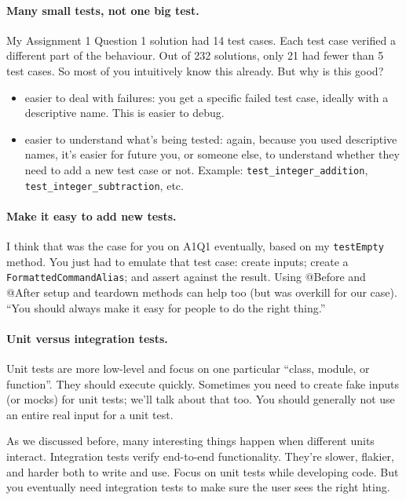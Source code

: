 \documentclass[11pt]{article}
\begin{document}
\paragraph{Many small tests, not one big test.} My Assignment 1 Question 1 solution had 14 test cases.
Each test case verified a different part of the behaviour. Out of 232 solutions, only 21 had fewer
than 5 test cases. So most of you intuitively know this already. But why is this good?

\begin{itemize}
\item easier to deal with failures: you get a specific failed test case, ideally with a descriptive name.
This is easier to debug.
\item easier to understand what's being tested: again, because you used descriptive names, it's easier
for future you, or someone else, to understand whether they need to add a new test case or not.
Example: {\tt test\_integer\_addition}, {\tt test\_integer\_subtraction}, etc.
\end{itemize}

\paragraph{Make it easy to add new tests.} I think that was the case for you on A1Q1 eventually,
based on my {\tt testEmpty} method. You just had to emulate that test
case: create inputs; create a {\tt FormattedCommandAlias}; and assert
against the result. Using @Before and @After setup and teardown
methods can help too (but was overkill for our case). ``You should
always make it easy for people to do the right thing.''

\paragraph{Unit versus integration tests.} Unit tests are more low-level and focus on 
one particular ``class, module, or function''. They should execute quickly. Sometimes you 
need to create fake inputs (or mocks) for unit tests; we'll talk about that too. You should generally
not use an entire real input for a unit test.

As we discussed before, many interesting things happen when different units interact.
Integration tests verify end-to-end functionality. They're slower, flakier, and harder both
to write and use. Focus on unit tests while developing code. But you eventually need
integration tests to make sure the user sees the right hting.
\end{document}
